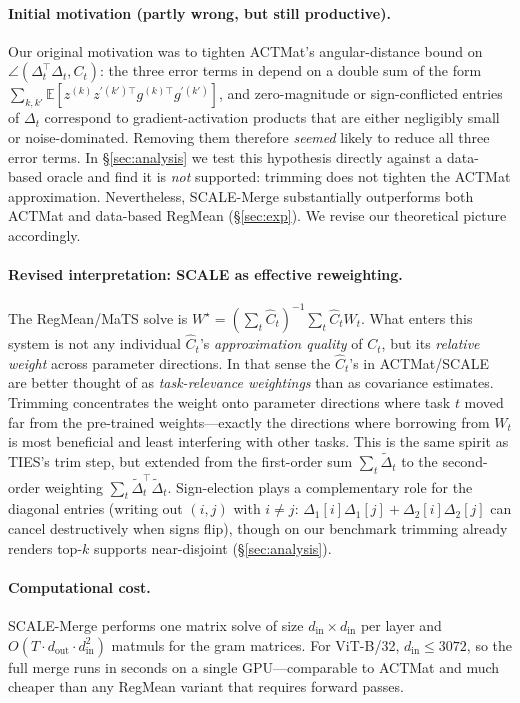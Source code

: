 \documentclass{article} %
\newcommand{\ws}{W^\star}
\begin{document}
\paragraph{Initial motivation (partly wrong, but still productive).} Our original motivation was to tighten ACTMat's angular-distance bound on $\angle(\Delta_t^\top\Delta_t, C_t)$: the three error terms in \citet[Theorem 3.1]{hameed2025actmat} depend on a double sum of the form $\sum_{k,k'}\mathbb{E}[z^{(k)} z^{\prime (k')\top} g^{(k)\top} g^{\prime(k')}]$, and zero-magnitude or sign-conflicted entries of $\Delta_t$ correspond to gradient-activation products that are either negligibly small or noise-dominated. Removing them therefore \emph{seemed} likely to reduce all three error terms. In \S\ref{sec:analysis} we test this hypothesis directly against a data-based oracle and find it is \emph{not} supported: trimming does not tighten the ACTMat approximation. Nevertheless, SCALE-Merge substantially outperforms both ACTMat and data-based RegMean (\S\ref{sec:exp}). We revise our theoretical picture accordingly.

\paragraph{Revised interpretation: SCALE as effective reweighting.} The RegMean/MaTS solve is $\ws = (\sum_t \hat C_t)^{-1} \sum_t \hat C_t W_t$. What enters this system is not any individual $\hat C_t$'s \emph{approximation quality} of $C_t$, but its \emph{relative weight} across parameter directions. In that sense the $\hat C_t$'s in ACTMat/SCALE are better thought of as \emph{task-relevance weightings} than as covariance estimates. Trimming concentrates the weight onto parameter directions where task $t$ moved far from the pre-trained weights---exactly the directions where borrowing from $W_t$ is most beneficial and least interfering with other tasks. This is the same spirit as TIES's trim step, but extended from the first-order sum $\sum_t\tilde\Delta_t$ to the second-order weighting $\sum_t\tilde\Delta_t^\top\tilde\Delta_t$. Sign-election plays a complementary role for the diagonal entries (writing out $(i,j)$ with $i\neq j$: $\Delta_1[i]\Delta_1[j] + \Delta_2[i]\Delta_2[j]$ can cancel destructively when signs flip), though on our benchmark trimming already renders top-$k$ supports near-disjoint (\S\ref{sec:analysis}).

\paragraph{Computational cost.} SCALE-Merge performs one matrix solve of size $d_\text{in}\times d_\text{in}$ per layer and $O(T\cdot d_\text{out}\cdot d_\text{in}^2)$ matmuls for the gram matrices. For ViT-B/32, $d_\text{in} \le 3072$, so the full merge runs in seconds on a single GPU---comparable to ACTMat and much cheaper than any RegMean variant that requires forward passes.
\end{document}
